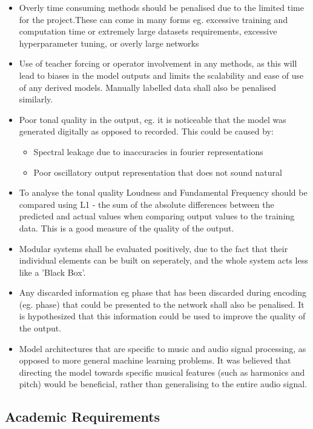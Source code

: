 \begin{itemize}
    \item Overly time consuming methods should be penalised due to the limited time for the project.These can come in many forms eg. excessive training and computation time or extremely large datasets requirements, excessive hyperparameter tuning, or overly large networks
    \item Use of teacher forcing or operator involvement in any methods, as this will lead to biases in the model outputs and limits the scalability and ease of use of any derived models. Manually labelled data shall also be penalised similarly.
    \item Poor tonal quality in the output, eg. it is noticeable that the model was generated digitally as opposed to recorded. This could be caused by:
          \begin{itemize}
              \item Spectral leakage due to inaccuracies in fourier representations
              \item Poor oscillatory output representation that does not sound natural
          \end{itemize}
    \item To analyse the tonal quality Loudness and Fundamental Frequency should be compared using L1 - the sum of the absolute differences between the predicted and actual values when comparing output values to the training data. This is a good measure of the quality of the output.
    \item Modular systems shall be evaluated positively, due to the fact that their individual elements can be built on seperately, and the whole system acts less like a 'Black Box'.
    \item Any discarded information eg phase that has been discarded during encoding (eg. phase) that could be presented to the network shall also be penalised. It is hypothesized that this information could be used to improve the quality of the output.
    \item Model\cite{Attention} architectures that are specific to music and audio signal processing, as opposed to more general machine learning problems. It was believed that directing the model towards specific musical features (such as harmonics and pitch) would be beneficial, rather than generalising to the entire audio signal.
\end{itemize}

\subsection{Academic Requirements}

